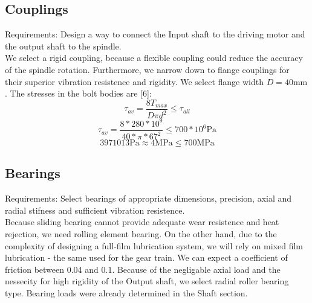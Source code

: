 \documentclass{article}
\begin{document}
\subsection{Couplings}
Requirements: Design a way to connect the Input shaft to the driving motor and the output shaft to the spindle. \\[0.3cm]
We select a rigid coupling, because a flexible coupling could reduce the accuracy of the spindle rotation.
Furthermore, we narrow down to flange couplings for their superior vibration resistence and rigidity.
We select flange width $D = 40\si{\milli\meter}$.
The stresses in the bolt bodies are [6]:
$$ \tau_{av} = \frac{8 T_{max}}{D \pi d^2} \leq \tau_{all} $$  %
$$ \tau_{av} = \frac{8 * 280 * 10^9}{40 *\pi *67^2} \leq  700 * 10^6 \si{\pascal}$$
$$ 3971013 \si{\pascal} \approx 4\si{\mega\pascal} \leq 700 \si{\mega\pascal}$$

\subsection{Bearings}
Requirements: Select bearings of appropriate dimensions, precision, axial and radial stifness and sufficient vibration resistence.\\[0.3cm]
Because sliding bearing cannot provide adequate wear resistence and heat rejection, we need rolling element bearing.
On the other hand, due to the complexity of designing a full-film lubrication system, we will rely on mixed film lubrication - the same used for the gear train.
We can expect a coefficient of friction between 0.04 and 0.1.
Because of the negligable axial load and the nessecity for high rigidity of the Output shaft, we select radial roller bearing type.
Bearing loads were already determined in the Shaft section.

\end{document}
